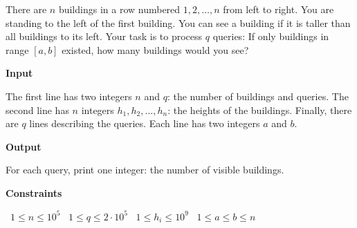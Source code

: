 There are $n$ buildings in a row numbered $1, 2,\dots, n$ from left to right. You are standing to the left of the first building. You can see a building if it is taller than all buildings to its left.
Your task is to process $q$ queries: If only buildings in range $[a, b]$ existed, how many buildings would you see?

\vspace{0.3cm}\noindent\textbf{Input}

The first line has two integers $n$ and $q$: the number of buildings and queries.
The second line has $n$ integers $h_1, h_2, \dots, h_n$: the heights of the buildings.
Finally, there are $q$ lines describing the queries. Each line has two integers $a$ and $b$.

\vspace{0.3cm}\noindent\textbf{Output}

For each query, print one integer: the number of visible buildings.

\vspace{0.3cm}\noindent\textbf{Constraints}

\textbullet\ $1 \le n \le 10^5$
\textbullet\ $1 \le q \le 2 \cdot 10^5$
\textbullet\ $1 \le h_i \le 10^9$
\textbullet\ $1 \le a \le b \le n$